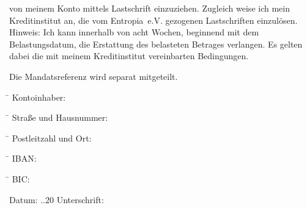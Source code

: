 \documentclass{scrartcl}
\begin{document}
von meinem Konto mittels Lastschrift einzuziehen. Zugleich weise ich mein Kreditinstitut an, die vom Entropia~e.\thinspace V. gezogenen Lastschriften einzul\"osen.\\

\footnotesize
Hinweis: Ich kann innerhalb von acht Wochen, beginnend mit dem Belastungsdatum, die Erstattung des belasteten Betrages verlangen. Es gelten dabei die mit meinem Kreditinstitut vereinbarten Bedingungen.
\normalsize

\addvspace{0.2cm}
Die Mandatsreferenz wird separat mitgeteilt.
\begin{tabbing}
\hspace*{5cm}\= \hspace*{7cm} \kill
Kontoinhaber: \> \underline{\hspace{335pt}}
\end{tabbing}
\begin{tabbing}
\hspace*{5cm}\= \hspace*{7cm} \kill
Stra{\ss}e und Hausnummer: \> \underline{\hspace{335pt}}
\end{tabbing}
\begin{tabbing}
\hspace*{5cm}\= \hspace*{7cm} \kill
Postleitzahl und Ort: \> \underline{\hspace{335pt}}
\end{tabbing}
\begin{tabbing}
\hspace*{5cm}\= \hspace*{7cm} \kill
IBAN:\enskip\hrulefill \> \underline{\hspace{335pt}}
\end{tabbing}
\begin{tabbing}
\hspace*{5cm}\= \hspace*{7cm} \kill
BIC:\enskip\hrulefill \> \underline{\hspace{335pt}}
\end{tabbing}

\addvspace{0.4cm}

Datum: \hspace{2pt} \underline{\hspace{20pt}}.\underline{\hspace{20pt}}.20\underline{\hspace{20pt}} Unterschrift: \hspace{2pt} \underline{\hspace{10cm}} 
\end{document}
